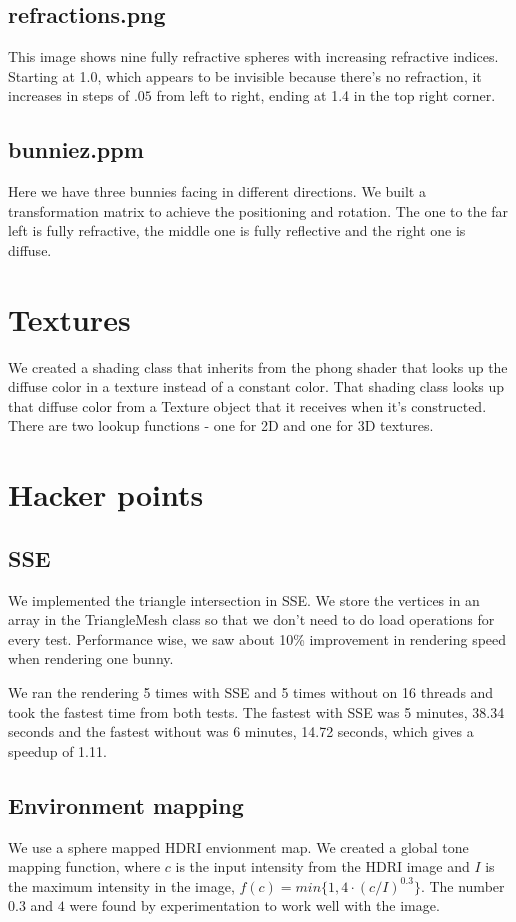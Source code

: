 \documentclass{article} %
\begin{document}
\subsection{refractions.png}
This image shows nine fully refractive spheres with increasing refractive indices. Starting at 1.0, which appears to be invisible because there's no refraction, it increases in steps of $.05$ from left to right, ending at 1.4 in the top right corner.

\subsection{bunniez.ppm}
Here we have three bunnies facing in different directions. We built a transformation matrix to achieve the positioning and rotation. The one to the far left is fully refractive, the middle one is fully reflective and the right one is diffuse. 

\section{Textures}
We created a shading class that inherits from the phong shader that looks up the diffuse color in a texture instead of a constant color. That shading class looks up that diffuse color from a Texture object that it receives when it's constructed. There are two lookup functions - one for 2D and one for 3D textures.

\section{Hacker points}
\subsection{SSE}
We implemented the triangle intersection in SSE. We store the vertices in an array in the TriangleMesh class so that we don't need to do load operations for every test. Performance wise, we saw about 10\% improvement in rendering speed when rendering one bunny. 

We ran the rendering 5 times with SSE and 5 times without on 16 threads and took the fastest time from both tests. The fastest with SSE was 5 minutes, 38.34 seconds and the fastest without was 6 minutes, 14.72 seconds, which gives a speedup of 1.11.

\subsection{Environment mapping}
We use a sphere mapped HDRI envionment map. We created a global tone mapping function, where $c$ is the input intensity from the HDRI image and $I$ is the maximum intensity in the image, $f(c)=min\{1, 4\cdot(c/I)^{0.3}\}$. The number $0.3$ and $4$ were found by experimentation to work well with the image.
\end{document}
